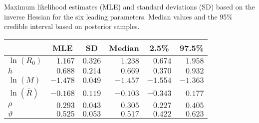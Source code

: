 %
\begin{tablehere}
 \caption{Maximum likelihood estimates (MLE) and standard deviations (SD)
				based on the inverse Hessian for the six leading parameters. Median
				values and the 95\% credible interval based on posterior samples.\label{iscam.T2}} 
 \begin{center}
 \begin{tabular}{lrrrrr}\hline\hline
\multicolumn{1}{l}{}&\multicolumn{1}{c}{MLE}&\multicolumn{1}{c}{SD}&\multicolumn{1}{c}{Median}&\multicolumn{1}{c}{2.5\%}&\multicolumn{1}{c}{97.5\%}\tabularnewline
\hline
$\ln(R_0)$&$ 1.167$&$0.326$&$ 1.238$&$ 0.674$&$ 1.958$\tabularnewline
$h$&$ 0.688$&$0.214$&$ 0.669$&$ 0.370$&$ 0.932$\tabularnewline
$\ln(M)$&$-1.478$&$0.049$&$-1.457$&$-1.554$&$-1.363$\tabularnewline
$\ln(\bar{R})$&$-0.168$&$0.119$&$-0.103$&$-0.343$&$ 0.177$\tabularnewline
$\rho$&$ 0.293$&$0.043$&$ 0.305$&$ 0.227$&$ 0.405$\tabularnewline
$\vartheta$&$ 0.525$&$0.053$&$ 0.517$&$ 0.422$&$ 0.623$\tabularnewline
\hline
\end{tabular}

\end{center}

\end{tablehere}

